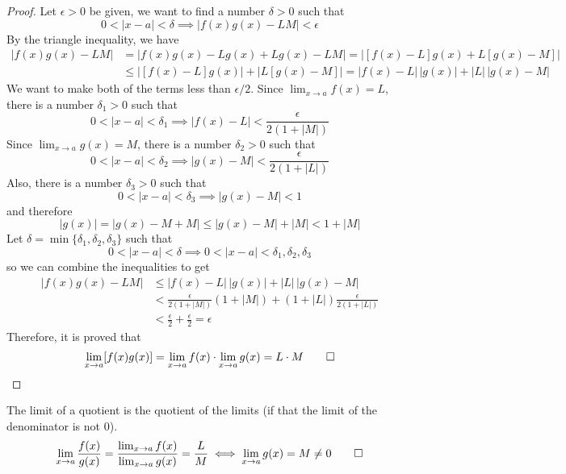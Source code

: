 \begin{proof}
    Let \(\epsilon>0\) be given, we want to find a number \(\delta>0\) such
    that \[0<|x-a|<\delta\implies|f(x)g(x)-LM|<\epsilon\]
    By the triangle inequality, we have
    \begin{align*}
        |f(x)g(x)-LM|&=|f(x)g(x)-Lg(x)+Lg(x)-LM|=|[f(x)-L]g(x)+L[g(x)-M]| \\
        &\leq |[f(x)-L]g(x)|+|L[g(x)-M]|=|f(x)-L|\,|g(x)|+|L|\,|g(x)-M|
    \end{align*}
    We want to make both of the terms less than \(\epsilon/2\).
    Since \(\lim_{x\to a}f(x)=L\), there is a number \(\delta_1>0\) such that
    \[0<|x-a|<\delta_1\implies|f(x)-L|<\frac{\epsilon}{2(1+|M|)}\]
    Since \(\lim_{x\to a}g(x)=M\), there is a number \(\delta_2>0\) such that
    \[0<|x-a|<\delta_2\implies|g(x)-M|<\frac{\epsilon}{2(1+|L|)}\]
    Also, there is a number \(\delta_3>0\) such that
    \[0<|x-a|<\delta_3\implies|g(x)-M|<1\] and therefore
    \[|g(x)|=|g(x)-M+M|\leq|g(x)-M|+|M|<1+|M|\]
    Let \(\delta=\min\{\delta_1,\delta_2,\delta_3\}\) such that
    \[0<|x-a|<\delta\implies0<|x-a|<\delta_1,\delta_2,\delta_3\]
    so we can combine the inequalities to get
    \begin{align*}
        |f(x)g(x)-LM|&\leq|f(x)-L|\,|g(x)|+|L|\,|g(x)-M| \\
        &<\frac{\epsilon}{2(1+|M|)}(1+|M|)+(1+|L|)\frac{\epsilon}{2(1+|L|)} \\
        &<\frac{\epsilon}{2}+\frac{\epsilon}{2}=\epsilon
    \end{align*}
    Therefore, it is proved that
    \[\lim_{x\to a}[f(x)g(x)]=\lim_{x\to a}f(x)\cdot\lim_{x\to a}g(x)
    =L\cdot M\qedhere\]
\end{proof}
\begin{theorem}
    The limit of a quotient is the quotient of the limits (if that the
    limit of the denominator is not 0).
    \[\lim_{x\to a}\frac{f(x)}{g(x)}=\frac{\lim_{x\to a}f(x)}{\lim_{x\to a}g(x)}
    =\frac{L}{M}\iff\lim_{x\to a}g(x)=M\neq0\qedhere\]
\end{theorem}
